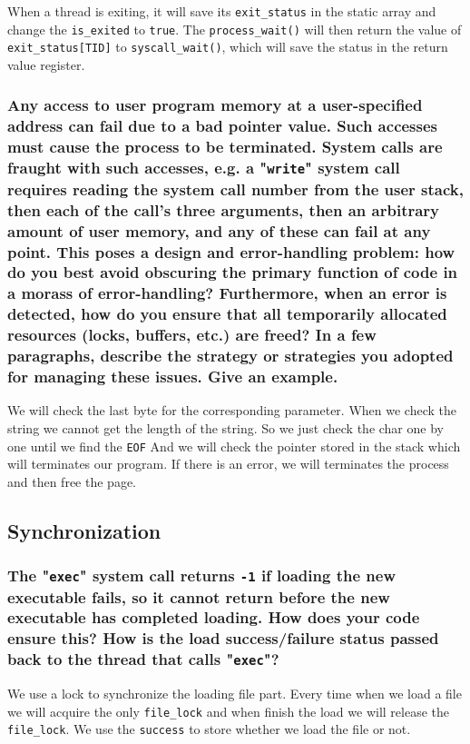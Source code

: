 \documentclass[sigconf, nonacm, balance=false, urlbreakonhyphens=true]{acmart}
\begin{document}
            When a thread is exiting, it will save its \texttt{exit\_status} in the static array and change the \texttt{is\_exited} to \texttt{true}. The \texttt{process\_wait()} will then return the value of \texttt{exit\_status[TID]} to \texttt{syscall\_wait()}, which will save the status in the return value register. 

            \subsubsection{Any access to user program memory at a user-specified address can fail due to a bad pointer value.  Such accesses must cause the process to be terminated.  System calls are fraught with such accesses, e.g. a "\texttt{write}" system call requires reading the system call number from the user stack, then each of the call's three arguments, then an arbitrary amount of user memory, and any of these can fail at any point.  This poses a design and error-handling problem: how do you best avoid obscuring the primary function of code in a morass of error-handling?  Furthermore, when an error is detected, how do you ensure that all temporarily allocated resources (locks, buffers, etc.) are freed?  In a few paragraphs, describe the strategy or strategies you adopted for managing these issues.  Give an example.}
            
            We will check the last byte for the corresponding parameter. When we check the string we cannot get the length of the string. So we just check the char one by one until we find the \texttt{EOF} And we will check the pointer stored in the stack which will terminates our program. If there is an error, we will terminates the process and then free the page.

        \subsection{Synchronization}

            \subsubsection{The "\texttt{exec}" system call returns \texttt{-1} if loading the new executable fails, so it cannot return before the new executable has completed loading.  How does your code ensure this?  How is the load success/failure status passed back to the thread that calls "\texttt{exec}"? }
            
            We use a lock to synchronize the loading file part. Every time when we load a file we will acquire the only \texttt{file\_lock} and when finish the load we will release the \texttt{file\_lock}. We use the \texttt{success} to store whether we load the file or not.
\end{document}
